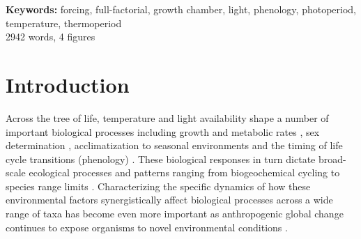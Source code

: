 \documentclass[11pt]{article}
\begin{document}
\textbf{Keywords:}  forcing, full-factorial,  growth chamber, light,  phenology, photoperiod, temperature, thermoperiod \\

2942 words, 4 figures
\pagebreak
\section*{Introduction}
\noindent Across the tree of life, temperature and light availability shape a number of important biological processes including growth and metabolic rates \citep{MacLean:2019aa}, sex determination \citep{Brown:2014vn}, acclimatization to seasonal environments \citep{Hamilton2016} and the timing of life cycle transitions (phenology) \citep{Forrest2010}. These biological responses in turn dictate broad-scale ecological processes and patterns ranging from biogeochemical cycling \citep{Piao2007} to species range limits \citep{Chuine2001}. Characterizing the specific dynamics of how these environmental factors synergistically affect biological processes across a wide range of taxa has become even more important as anthropogenic global change continues to expose organisms to novel environmental conditions \citep{Portner:2008vd}.
\end{document}
